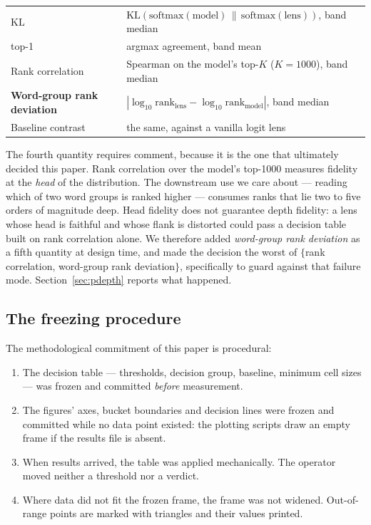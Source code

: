 \documentclass[11pt]{article}
\begin{document}
\begin{center}
\small
\begin{tabular}{@{}ll@{}}
\toprule
$\mathrm{KL}$ & $\mathrm{KL}(\mathrm{softmax}(\text{model})\,\|\,\mathrm{softmax}(\text{lens}))$, band median \\
top-1 & argmax agreement, band mean \\
Rank correlation & Spearman on the model's top-$K$ ($K=1000$), band median \\
\textbf{Word-group rank deviation} & $|\log_{10}\text{rank}_{\text{lens}} - \log_{10}\text{rank}_{\text{model}}|$, band median \\
Baseline contrast & the same, against a vanilla logit lens~\cite{nostalgebraist2020logitlens} \\
\bottomrule
\end{tabular}
\end{center}

The fourth quantity requires comment, because it is the one that
ultimately decided this paper. Rank correlation over the model's top-1000
measures fidelity at the \emph{head} of the distribution. The downstream
use we care about --- reading which of two word groups is ranked higher
--- consumes ranks that lie two to five orders of magnitude deep. Head
fidelity does not guarantee depth fidelity: a lens whose head is faithful
and whose flank is distorted could pass a decision table built on rank
correlation alone. We therefore added \emph{word-group rank deviation} as
a fifth quantity at design time, and made the decision the worst of
$\{$rank correlation, word-group rank deviation$\}$, specifically to
guard against that failure mode. Section~\ref{sec:pdepth} reports what
happened.

\subsection{The freezing procedure}
\label{sec:freeze}

The methodological commitment of this paper is procedural:

\begin{enumerate}\itemsep2pt
\item The decision table --- thresholds, decision group, baseline,
  minimum cell sizes --- was frozen and committed \emph{before}
  measurement.
\item The figures' axes, bucket boundaries and decision lines were
  frozen and committed while no data point existed: the plotting scripts
  draw an empty frame if the results file is absent.
\item When results arrived, the table was applied mechanically. The
  operator moved neither a threshold nor a verdict.
\item Where data did not fit the frozen frame, the frame was not widened.
  Out-of-range points are marked with triangles and their values printed.
\end{enumerate}
\end{document}

